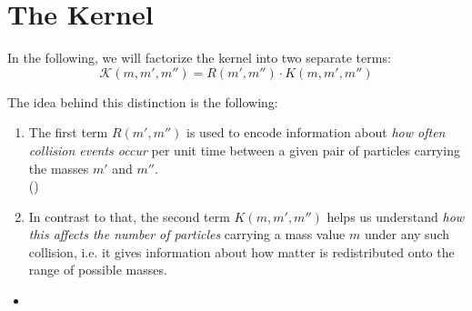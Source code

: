 
\newpage\section{The Kernel}

    In the following, we will factorize the kernel into two separate terms:
    \begin{equation}
        \mathcal K(m,m',m'') = R(m',m'') \cdot K(m,m',m'') 
    \end{equation}

    The idea behind this distinction is the following: 
    \begin{enumerate}
        \item The first term $R(m',m'')$ is used to encode information about 
            \textit{how often collision events occur} per unit time between a given
            pair of particles carrying the masses $m'$ and $m''$. \\
            ()
        \item In contrast to that, the second term $K(m,m',m'')$ helps us understand 
            \textit{how this affects the number of particles} carrying a mass value $m$ under any
            such collision, i.e. it gives information about how matter is redistributed onto the
            range of possible masses.
    \end{enumerate}


    \begin{itemize}
        \item {}
    \end{itemize}




